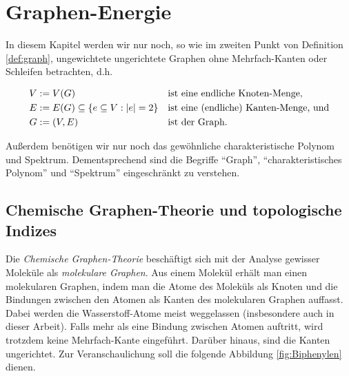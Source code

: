 \chapter{Graphen-Energie}

    In diesem Kapitel werden wir nur noch, so wie im zweiten Punkt von Definition \ref{def:graph}, ungewichtete ungerichtete Graphen ohne Mehrfach-Kanten oder Schleifen betrachten, d.h.

    \begin{align*}
        V & := V(G)                                            && \text{ist eine endliche Knoten-Menge,} \\
        E & := E(G) \subseteq {\left \{ e \subseteq V: |e| = 2 \right \}} && \text{ist eine (endliche) Kanten-Menge, und} \\
        G & := (V, E)                                          && \text{ist der Graph.}
    \end{align*}

    Außerdem benötigen wir nur noch das gewöhnliche charakteristische Polynom und Spektrum.
    Dementsprechend sind die Begriffe \enquote{Graph}, \enquote{charakteristisches Polynom} und \enquote{Spektrum} eingeschränkt zu verstehen.

    \section{Chemische Graphen-Theorie und topologische Indizes}

        Die \textit{Chemische Graphen-Theorie} beschäftigt sich mit der Analyse gewisser Moleküle als \textit{molekulare Graphen}.
        Aus einem Molekül erhält man einen molekularen Graphen, indem man die Atome des Moleküls als Knoten und die Bindungen zwischen den Atomen als Kanten des molekularen Graphen auffasst.
        Dabei werden die Wasserstoff-Atome meist weggelassen (insbesondere auch in dieser Arbeit).
        Falls mehr als eine Bindung zwischen Atomen auftritt, wird trotzdem keine Mehrfach-Kante eingeführt.
        Darüber hinaus, sind die Kanten ungerichtet.
        Zur Veranschaulichung soll die folgende Abbildung \ref{fig:Biphenylen} dienen.

